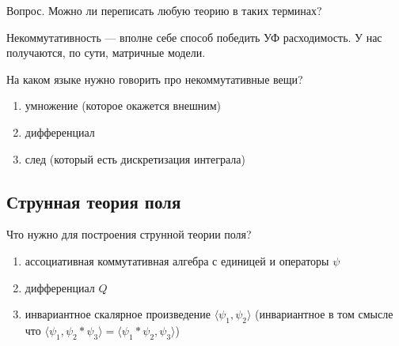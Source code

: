 \documentclass[11pt]{article}
\def\ph{\varphi}
\theoremstyle{remark}
\theoremstyle{definition}
\renewcommand{\sqrt}[1][\ ]{%
  \def\DHLindex{#1}\mathpalette\DHLhksqrt}
\def\DHLhksqrt#1#2{%
  \setbox0=\hbox{$#1\oldsqrt[\DHLindex]{#2\,}$}\dimen0=\ht0
  \advance\dimen0-0.2\ht0
  \setbox2=\hbox{\vrule height\ht0 depth -\dimen0}%
  {\box0\lower0.71pt\box2}}
\begin{document}
\footnotesize{}

Вопрос. Можно ли переписать любую теорию в таких терминах?

\normalsize{}

Некоммутативность --- вполне себе способ победить УФ расходимость. У нас получаются, по сути, матричные модели.

\begin{center}
\end{center}

На каком языке нужно говорить про некоммутативные вещи?

\begin{enumerate}
\item умножение (которое окажется внешним)
\item дифференциал
\item след (который есть дискретизация интеграла)
\end{enumerate}

\subsection{Струнная теория поля}

Что нужно для построения струнной теории поля?

\begin{enumerate}
\item ассоциативная коммутативная алгебра с единицей и операторы $\psi$
\item дифференциал $Q$
\item инвариантное скалярное произведение $\langle \psi_1, \psi_2 \rangle$ (инвариантное в том смысле что $\langle \psi_1, \psi_2 * \psi_3 \rangle = \langle \psi_1 * \psi_2, \psi_3 \rangle$)
\end{enumerate}
\end{document}
